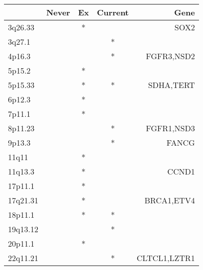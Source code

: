 \begin{tabular}{lcccr}
\toprule
{} & Never & Ex & Current &          Gene \\
\midrule
3q26.33  &       &  * &         &          SOX2 \\
3q27.1   &       &    &       * &               \\
4p16.3   &       &    &       * &    FGFR3,NSD2 \\
5p15.2   &       &  * &         &               \\
5p15.33  &       &  * &       * &     SDHA,TERT \\
6p12.3   &       &  * &         &               \\
7p11.1   &       &  * &         &               \\
8p11.23  &       &    &       * &    FGFR1,NSD3 \\
9p13.3   &       &    &       * &         FANCG \\
11q11    &       &  * &         &               \\
11q13.3  &       &  * &         &         CCND1 \\
17p11.1  &       &  * &         &               \\
17q21.31 &       &  * &         &    BRCA1,ETV4 \\
18p11.1  &       &  * &       * &               \\
19q13.12 &       &    &       * &               \\
20p11.1  &       &  * &         &               \\
22q11.21 &       &    &       * &  CLTCL1,LZTR1 \\
\bottomrule
\end{tabular}
